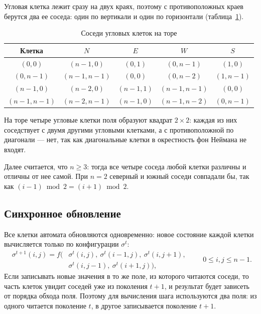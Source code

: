 Угловая клетка лежит сразу на двух краях, поэтому с противоположных краев берутся два ее соседа: один по вертикали и один по горизонтали (таблица~\ref{tab:corners}).

\begin{table}[H]
	\centering
	\caption{Соседи угловых клеток на торе}
	\label{tab:corners}
	\begin{tabular}{|c|c|c|c|c|}
		\hline
		Клетка & $N$ & $E$ & $W$ & $S$ \\
		\hline
		$(0, 0)$         & $(n-1, 0)$   & $(0, 1)$     & $(0, n-1)$   & $(1, 0)$ \\
		$(0, n-1)$       & $(n-1, n-1)$ & $(0, 0)$     & $(0, n-2)$   & $(1, n-1)$ \\
		$(n-1, 0)$       & $(n-2, 0)$   & $(n-1, 1)$   & $(n-1, n-1)$ & $(0, 0)$ \\
		$(n-1, n-1)$     & $(n-2, n-1)$ & $(n-1, 0)$   & $(n-1, n-2)$ & $(0, n-1)$ \\
		\hline
	\end{tabular}
\end{table}

На торе четыре угловые клетки поля образуют квадрат $2 \times 2$: каждая из них соседствует с двумя другими угловыми клетками, а с противоположной по диагонали --- нет, так как диагональные клетки в окрестность фон Неймана не входят.

Далее считается, что $n \ge 3$: тогда все четыре соседа любой клетки различны и отличны от нее самой. При $n = 2$ северный и южный соседи совпадали бы, так как $(i-1) \bmod 2 = (i+1) \bmod 2$.

\subsection{Синхронное обновление}

Все клетки автомата обновляются одновременно: новое состояние каждой клетки вычисляется только по конфигурации $\sigma^t$:
\[
	\begin{split}
		\sigma^{t+1}(i, j) = f\bigl(&\sigma^t(i, j),\ \sigma^t(i-1, j),\ \sigma^t(i, j+1),\\
		&\sigma^t(i, j-1),\ \sigma^t(i+1, j)\bigr),
	\end{split}
	\qquad 0 \le i, j \le n-1.
\]
Если записывать новые значения в то же поле, из которого читаются соседи, то часть клеток увидит соседей уже из поколения $t+1$, и результат будет зависеть от порядка обхода поля. Поэтому для вычисления шага используются два поля: из одного читается поколение $t$, в другое записывается поколение $t+1$.

